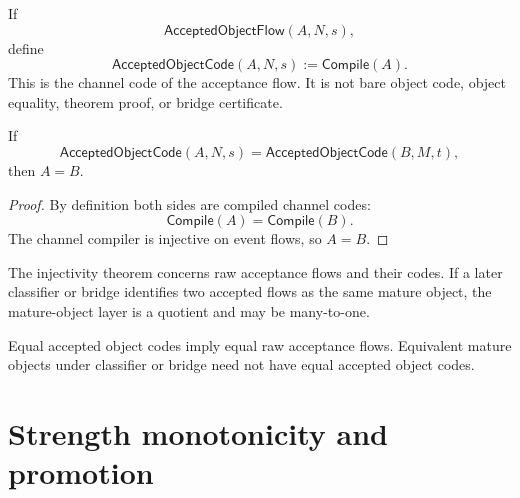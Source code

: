 \begin{definition}
\label{def:deriv-accept-accepted-object-code}
If
$$
  \mathsf{AcceptedObjectFlow}(A,N,s),
$$
define
$$
  \mathsf{AcceptedObjectCode}(A,N,s):=\mathsf{Compile}(A).
$$
This is the channel code of the acceptance flow. It is not bare object code, object equality, theorem proof, or bridge certificate.
\end{definition}

\begin{theorem}
\label{thm:deriv-accept-code-injective-raw-flows}
If
$$
  \mathsf{AcceptedObjectCode}(A,N,s)
  =
  \mathsf{AcceptedObjectCode}(B,M,t),
$$
then $A=B$.
\end{theorem}

\begin{proof}
By definition both sides are compiled channel codes:
$$
  \mathsf{Compile}(A)=\mathsf{Compile}(B).
$$
The channel compiler is injective on event flows, so $A=B$.
\end{proof}

\begin{remark}
\label{rem:deriv-accept-code-not-object-identity}
The injectivity theorem concerns raw acceptance flows and their codes. If a later classifier or bridge identifies two accepted flows as the same mature object, the mature-object layer is a quotient and may be many-to-one.
\end{remark}

\begin{corollary}
\label{cor:deriv-accept-code-stronger-than-equivalence}
Equal accepted object codes imply equal raw acceptance flows. Equivalent mature objects under classifier or bridge need not have equal accepted object codes.
\end{corollary}

\section{Strength monotonicity and promotion}
\label{sec:deriv-accept-strength-promotion}

